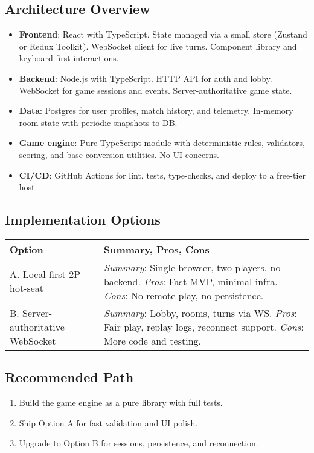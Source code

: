 \documentclass[12pt]{article}
\begin{document}
\subsection{Architecture Overview}
\begin{itemize}
  \item \textbf{Frontend}: React with TypeScript. State managed via a small store (Zustand or Redux Toolkit). WebSocket client for live turns. Component library and keyboard-first interactions.
  \item \textbf{Backend}: Node.js with TypeScript. HTTP API for auth and lobby. WebSocket for game sessions and events. Server-authoritative game state.
  \item \textbf{Data}: Postgres for user profiles, match history, and telemetry. In-memory room state with periodic snapshots to DB.
  \item \textbf{Game engine}: Pure TypeScript module with deterministic rules, validators, scoring, and base conversion utilities. No UI concerns.
  \item \textbf{CI/CD}: GitHub Actions for lint, tests, type-checks, and deploy to a free-tier host.
\end{itemize}

\subsection{Implementation Options}
\begin{tabularx}{\textwidth}{lX}
  \toprule
  \textbf{Option} & \textbf{Summary, Pros, Cons} \\
  \midrule
  A. Local-first 2P hot-seat & \textit{Summary}: Single browser, two players, no backend. \textit{Pros}: Fast MVP, minimal infra. \textit{Cons}: No remote play, no persistence. \\
  \midrule
  B. Server-authoritative WebSocket & \textit{Summary}: Lobby, rooms, turns via WS. \textit{Pros}: Fair play, replay logs, reconnect support. \textit{Cons}: More code and testing. \\
  \midrule
\end{tabularx}

\subsection{Recommended Path}
\begin{enumerate}
  \item Build the game engine as a pure library with full tests.
  \item Ship Option A for fast validation and UI polish.
  \item Upgrade to Option B for sessions, persistence, and reconnection.
\end{enumerate}
\end{document}
